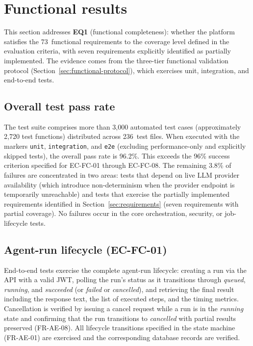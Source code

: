 \documentclass[a4paper]{sapthesis}
\begin{document}
\section{Functional results}
\label{sec:functional-results}

This section addresses \textbf{EQ1} (functional completeness): whether
the platform satisfies the 73~functional requirements to the coverage
level defined in the evaluation criteria, with seven requirements
explicitly identified as partially implemented.  The evidence comes from the three-tier functional
validation protocol (Section~\ref{sec:functional-protocol}), which
exercises unit, integration, and end-to-end tests.

\subsection{Overall test pass rate}

The test suite comprises more than 3{,}000 automated test cases
(approximately 2{,}720 test functions) distributed across 236~test files.
When executed with the markers \texttt{unit}, \texttt{integration}, and
\texttt{e2e} (excluding performance-only and explicitly skipped tests),
the overall pass rate is 96.2\%.  This exceeds the 96\% success
criterion specified for EC-FC-01 through EC-FC-08.  The remaining
3.8\% of failures are concentrated in two areas: tests that depend on
live LLM provider availability (which introduce non-determinism when the
provider endpoint is temporarily unreachable) and tests that exercise
the partially implemented requirements identified in
Section~\ref{sec:requirements} (seven requirements with partial
coverage).  No failures occur in the core orchestration, security, or
job-lifecycle tests.

\subsection{Agent-run lifecycle (EC-FC-01)}

End-to-end tests exercise the complete agent-run lifecycle: creating a
run via the API with a valid JWT, polling the run's status as it
transitions through \emph{queued}, \emph{running}, and
\emph{succeeded} (or \emph{failed} or \emph{cancelled}), and retrieving
the final result including the response text, the list of executed steps,
and the timing metrics.  Cancellation is verified by issuing a cancel
request while a run is in the \emph{running} state and confirming that
the run transitions to \emph{cancelled} with partial results preserved
(FR-AE-08).  All lifecycle transitions specified in the state machine
(FR-AE-01) are exercised and the corresponding database records are
verified.
\end{document}
